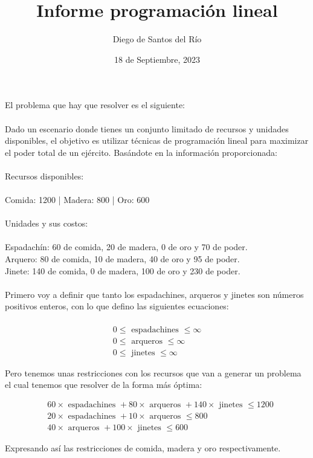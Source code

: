 \documentclass[10pt]{article}
\title{Informe programación lineal }
\author{Diego de Santos del Río}
\date{18 de Septiembre, 2023}
\begin{document}
\maketitle
El problema que hay que resolver es el siguiente:\\
\\
Dado un escenario donde tienes un conjunto limitado de recursos y unidades disponibles, el objetivo es utilizar técnicas de programación lineal para maximizar el poder total de un ejército. Basándote en la información proporcionada:\\
\\
Recursos disponibles:\\
\\
Comida: 1200 | Madera: 800 | Oro: 600\\
\\
Unidades y sus costos:\\
\\
Espadachín: 60 de comida, 20 de madera, 0 de oro y 70 de poder.\\
Arquero: 80 de comida, 10 de madera, 40 de oro y 95 de poder.\\
Jinete: 140 de comida, 0 de madera, 100 de oro y 230 de poder.\\
\\
Primero voy a definir que tanto los espadachines, arqueros y jinetes son números positivos enteros, con lo que defino las siguientes ecuaciones:\\
\\
$$
\begin{gathered}
0 \leq \text { espadachines } \leq \infty \\
0 \leq \text { arqueros } \leq \infty \\
0 \leq \text { jinetes } \leq \infty
\end{gathered}
$$

Pero tenemos unas restricciones con los recursos que van a generar un problema el cual tenemos que resolver de la forma más óptima:

$$
\begin{aligned}
& 60 \times \text { espadachines }+80 \times \text { arqueros }+140 \times \text { jinetes } \leq 1200 \\
& 20 \times \text { espadachines }+10 \times \text { arqueros } \leq 800 \\
& 40 \times \text { arqueros }+100 \times \text { jinetes } \leq 600
\end{aligned}
$$

Expresando así las restricciones de comida, madera y oro respectivamente.
\end{document}
